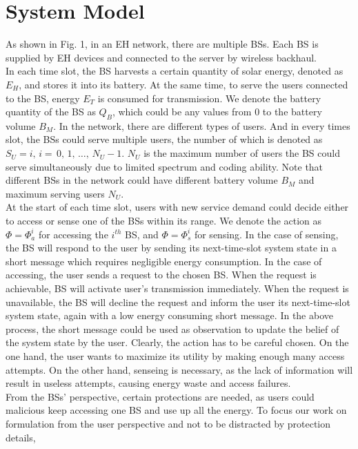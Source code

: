 \documentclass[conference]{IEEEtran}
\begin{document}
\section{System Model}
As shown in Fig. 1, in an EH network, there are multiple BSs.
Each BS is supplied by EH devices and connected to the server by wireless backhaul.\\\indent
In each time slot, the BS harvests a certain quantity of solar energy, 
denoted as \(E_H\), and stores it into its battery.
At the same time, to serve the users connected to the BS, energy \(E_T\) is consumed for transmission.
We denote the battery quantity of the BS as \(Q_B\),
which could be any values from \(0\) to the battery volume \(B_M\).
In the network, there are different types of users.
And in every times slot, the BSs could serve multiple users,
the number of which is denoted as \(S_U = i,\, i = \,0,\,1,\,\ldots,\,N_U-1\).
\(N_U\) is the maximum number of users the BS could serve simultaneously due to limited spectrum and coding ability.
Note that different BSs in the network could have different battery volume \(B_M\) and maximum serving users \(N_U\).\\\indent
At the start of each time slot,
users with new service demand could decide either to access or sense one of the BSs within its range.
We denote the action as \(\Phi = \Phi_{a}^i\) for accessing the \(i^{th}\) BS,
and \(\Phi = \Phi_{s}^i\) for sensing.
In the case of sensing,
the BS will respond to the user by sending its next-time-slot system state
in a short message which requires negligible energy consumption.
In the case of accessing, the user sends a request to the chosen BS.
When the request is achievable, BS will activate user's transmission immediately.
When the request is unavailable, the BS will decline the request and
inform the user its next-time-slot system state, again with a low energy consuming short message.
In the above process, the short message could
be used as observation to update the belief of the system state by the user.
Clearly, the action has to be careful chosen.
On the one hand, the user wants to maximize its utility by making enough many access attempts.
On the other hand, senseing is necessary,
as the lack of information will result in useless attempts, causing energy waste and access failures.\\
\indent
From the BSs' perspective, certain protections are needed,
as users could malicious keep accessing one BS and use up all the energy.
To focus our work on formulation from the user perspective and
not to be distracted by protection details,
\end{document}
